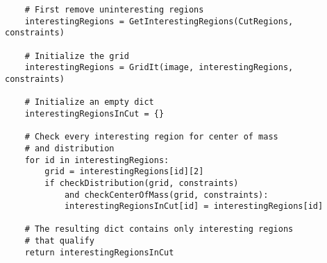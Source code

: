 {\begin{lstlisting}
    # First remove uninteresting regions
    interestingRegions = GetInterestingRegions(CutRegions, constraints)

    # Initialize the grid
    interestingRegions = GridIt(image, interestingRegions, constraints)

    # Initialize an empty dict
    interestingRegionsInCut = {}

    # Check every interesting region for center of mass
    # and distribution
    for id in interestingRegions:
        grid = interestingRegions[id][2]
        if checkDistribution(grid, constraints)
            and checkCenterOfMass(grid, constraints):
            interestingRegionsInCut[id] = interestingRegions[id]

    # The resulting dict contains only interesting regions
    # that qualify
    return interestingRegionsInCut
\end{lstlisting}

\clearpage

}

